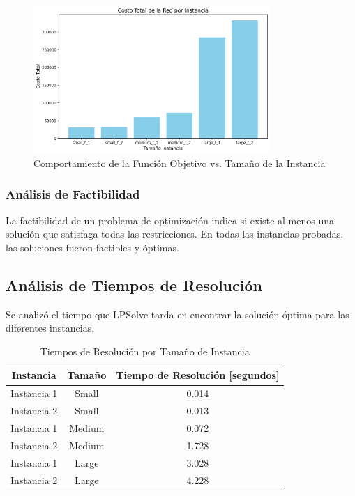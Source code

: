\documentclass[12pt]{article}
\begin{document}
\begin{figure}[H]
    \centering
    \includegraphics[width=0.8\textwidth]{of_values.png}
    \caption{Comportamiento de la Función Objetivo vs. Tamaño de la Instancia}
    \label{fig:FO_comportamiento}
\end{figure}

\subsubsection{Análisis de Factibilidad}
La factibilidad de un problema de optimización indica si existe al menos una solución que satisfaga todas las restricciones. En todas las instancias probadas, las soluciones fueron factibles y óptimas.

\subsection{Análisis de Tiempos de Resolución}
Se analizó el tiempo que LPSolve tarda en encontrar la solución óptima para las diferentes instancias.

\begin{table}[H]
    \centering
    \caption{Tiempos de Resolución por Tamaño de Instancia}
    \label{tab:Tiempos_resolucion}
    \begin{tabular}{|c|c|c|}
        \hline
        \textbf{Instancia} & \textbf{Tamaño} & \textbf{Tiempo de Resolución [segundos]} \\
        \hline
        Instancia 1 & Small & 0.014 \\
        Instancia 2 & Small & 0.013 \\
        \hline
        Instancia 1 & Medium & 0.072 \\
        Instancia 2 & Medium & 1.728 \\
        \hline
        Instancia 1 & Large & 3.028 \\
        Instancia 2 & Large & 4.228 \\
        \hline
    \end{tabular}
\end{table}
\end{document}
